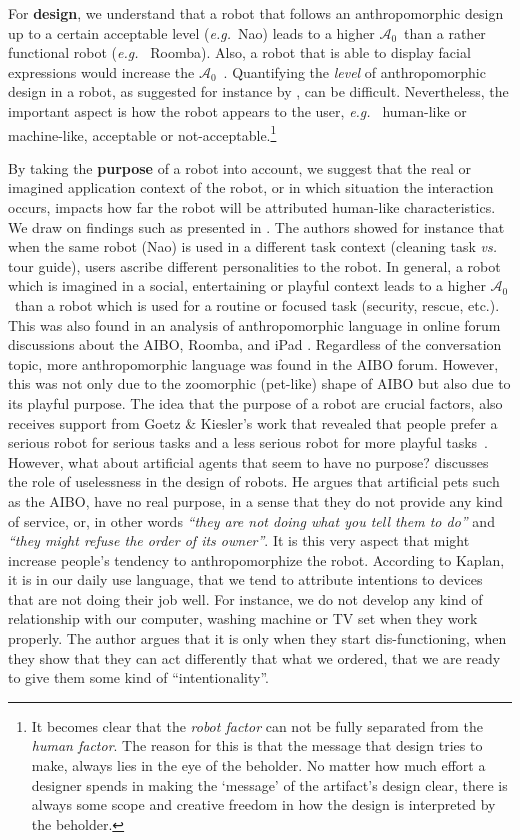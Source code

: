 \documentclass{frontiersSCNS} %
\newcommand{\eg}{{\textit{e.g.~}}}
\newcommand{\ICA}{{$\mathcal{A}_0$~}}
\begin{document}
For \textbf{design}, we understand that a robot that follows an anthropomorphic
design up to a certain acceptable level (\eg Nao) leads to a higher \ICA than a rather functional robot (\eg
Roomba). Also, a robot that is able to display facial expressions would increase
the \ICA. Quantifying the \emph{level} of anthropomorphic design in a robot, as
suggested for instance by \citet{fong_survey_2003}, can be difficult.
Nevertheless, the important aspect is how the robot appears to the user, \eg
human-like or machine-like, acceptable or not-acceptable.\footnote{It becomes clear that the \textit{robot factor} can not be fully separated from the \textit{human factor}. The reason for this is that the message that design tries to make, always lies in the eye of the beholder. No matter how much effort a designer spends in making the `message' of the artifact's design clear, there is always some scope and creative freedom in how the design is interpreted by the beholder.}

By taking the \textbf{purpose} of a robot into account, we suggest that the real
or imagined application context of the robot, or in which situation the interaction occurs, impacts how far the robot will be attributed human-like
characteristics. We draw on findings such as presented in \citet{joosse_what_2013}. The authors showed for instance that when the
same robot (Nao) is used in a different task context (cleaning task \emph{vs.}
tour guide), users ascribe different personalities to the robot. In general,
a robot which is imagined in a social, entertaining or playful
context leads to a higher \ICA than a robot which is used for a routine or
focused task (security, rescue, etc.). This was also found in an analysis of anthropomorphic language in online forum discussions about the AIBO, Roomba, and iPad \citep{fink_anthropomorphic_2012}. Regardless of the conversation topic, more anthropomorphic language was found in the AIBO forum. However, this was not only due to the zoomorphic (pet-like) shape of AIBO but also due to its  playful purpose. The idea that the purpose of a robot are crucial factors, also receives support from
Goetz \& Kiesler's work that revealed that people prefer a serious robot for
serious tasks and a less serious robot for more playful
tasks~\citep{goetz_cooperation_2002, goetz_matching_2003}.
However, what about artificial agents that seem to have no purpose? \cite{kaplan_free_2000} discusses the role of uselessness in the design of robots. He argues that artificial pets such as the AIBO, have no real purpose, in a sense that they do not provide any kind of service, or, in other words \textit{``they are not doing what you tell them to do''} and \textit{``they might refuse the order of its owner''}. It is this very aspect that might increase people's tendency to anthropomorphize the robot. According to Kaplan, it is in our daily use language, that we tend to attribute intentions to devices that are not doing their job well. For instance, we do not develop any kind of relationship with our computer, washing machine or TV set when they work properly. The author argues that it is only when they start dis-functioning, when they show that they can act differently that what we ordered, that we are ready to give them some kind of ``intentionality''.
\end{document}
